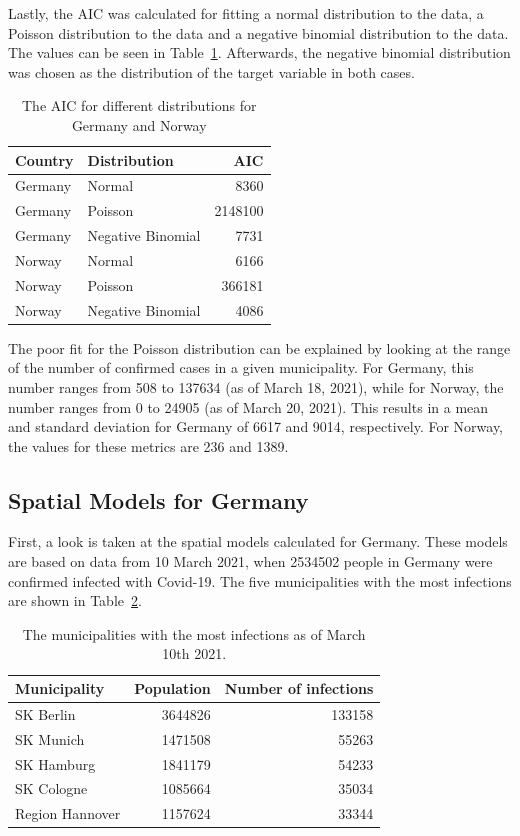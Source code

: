 Lastly, the AIC was calculated for fitting a normal distribution to the data, a Poisson distribution to the data and a negative binomial distribution to the data. The values can be seen in Table~\ref{aic}. Afterwards, the negative binomial distribution was chosen as the distribution of the target variable in both cases. \\
\begin{table}[H] 
\caption{The AIC for different distributions for Germany and Norway \label{aic}}
\begin{tabular}{l l r}
\toprule
\textbf{Country}	& \textbf{Distribution}	& \textbf{AIC} \\
\midrule
Germany & Normal & 8360 \\
Germany & Poisson & 2148100 \\
Germany & Negative Binomial & 7731 \\
Norway & Normal & 6166 \\
Norway & Poisson & 366181 \\
Norway & Negative Binomial & 4086 \\
\bottomrule
\end{tabular}
\end{table} 
The poor fit for the Poisson distribution can be explained by looking at the range of the number of confirmed cases in a given municipality. For Germany, this number ranges from 508 to 137634 (as of March 18, 2021), while for Norway, the number ranges from 0 to 24905 (as of March 20, 2021). This results in a mean and standard deviation for Germany of 6617 and 9014, respectively. For Norway, the values for these metrics are 236 and 1389.
\subsection{Spatial Models for Germany}
First, a look is taken at the spatial models calculated for Germany. These models are based on data from 10 March 2021, when 2534502 people in Germany were confirmed infected with Covid-19. The five municipalities with the most infections are shown in Table~\ref{top5germany}.
\begin{table}[H] 
\caption{The municipalities with the most infections as of March 10th 2021. \label{top5germany}}
\begin{tabular}{l r r}
\toprule
\textbf{Municipality}	& \textbf{Population}	& \textbf{Number of infections} \\
\midrule
SK Berlin & 3644826 & 133158 \\     
SK Munich & 1471508 & 55263 \\
SK Hamburg & 1841179 & 54233 \\
SK Cologne & 1085664 & 35034 \\
Region Hannover & 1157624 & 33344 \\
\bottomrule
\end{tabular}
\end{table}
